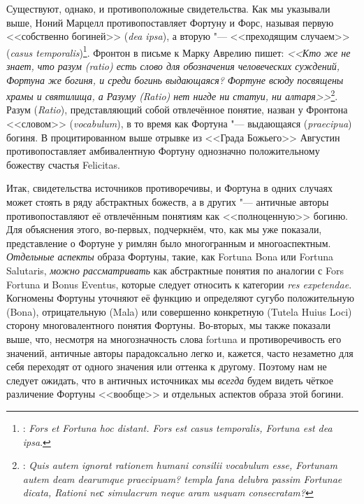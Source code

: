 Существуют, однако, и противоположные свидетельства. Как мы указывали выше, Ноний Марцелл противопоставляет Фортуну и Форс, называя первую <<собственно богиней>> (\textit{dea ipsa}), а вторую "--- <<преходящим случаем>> (\textit{casus temporalis})\footnote{: \textit{Fors et Fortuna hoc distant. Fors est casus temporalis, Fortuna est dea ipsa}.}. Фронтон в письме к Марку Аврелию пишет: \textit{<<Кто же не знает, что разум (ratio) есть слово для обозначения человеческих суждений, Фортуна же богиня, и среди богинь выдающаяся? Фортуне всюду посвящены храмы и святилища, а Разуму (Ratio) нет нигде ни статуи, ни алтаря>>}\footnote{: \textit{Quis autem ignorat rationem humani consilii vocabulum esse, Fortunam autem deam dearumque praecipuam? templa fana delubra passim Fortunae dicata, Rationi neс simulacrum neque aram usquam consecratam?}}. Разум (\textit{Ratio}), представляющий собой отвлечённое понятие, назван у Фронтона <<словом>> (\textit{vocabulum}), в то время как Фортуна "--- выдающаяся (\textit{praecipua}) богиня. В процитированном выше отрывке из <<Града Божьего>> Августин противопоставляет амбивалентную Фортуну однозначно положительному божеству счастья Felicitas.



Итак, свидетельства источников противоречивы, и Фортуна в одних случаях может стоять в ряду абстрактных божеств, а в других "--- античные авторы противопоставляют её отвлечённым понятиям как <<полноценную>> богиню. Для объяснения этого, во-первых, подчеркнём, что, как мы уже показали, представление о Фортуне у римлян было многогранным и многоаспектным. \textit{Отдельные аспекты} образа Фортуны, такие, как Fortuna Bona или Fortuna Salutaris, \textit{можно рассматривать} как абстрактные понятия по аналогии с Fors Fortuna и Bonus Eventus, которые следует относить к категории \textit{res expetendae}. Когномены Фортуны уточняют её функцию и определяют сугубо положительную (Bona), отрицательную (Mala) или совершенно конкретную (Tutela Huius Loci) сторону многовалентного понятия Фортуны. Во-вторых, мы также показали выше, что, несмотря на многозначность слова fortuna и противоречивость его значений, античные авторы парадоксально легко и, кажется, часто незаметно для себя переходят от одного значения или оттенка к другому. Поэтому нам не следует ожидать, что в античных источниках мы \textit{всегда} будем видеть чёткое различение Фортуны <<вообще>> и отдельных аспектов образа этой богини.

